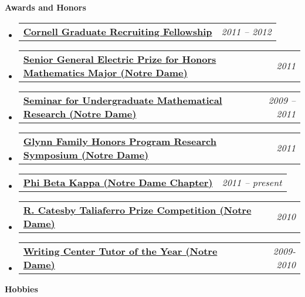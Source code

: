 \documentclass[letterpaper,11pt]{article}
\makeatletter
\newcommand{\resheading}[1]{{\large {\textbf{#1 \vphantom{p\^{E}}}}}}
\newenvironment{widetable}[1]
	       {\begin{tabular*}{#1}[t]{l@{\extracolsep{\fill}}r}}
	       {\end{tabular*}}
\newcommand{\resitemdate}[2]{
  \begin{widetable}{\textwidth - 28pt}
		\textbf{#1} & #2 \\
  \end{widetable}
  \vspace{-18pt}}
\makeatother
\begin{document}
\resheading{Awards and Honors}
\begin{itemize}
\item
  \resitemdate{\href{http://www.math.cornell.edu/Graduate/Funds/fellowships.html}{Cornell Graduate Recruiting Fellowship}}{\emph{2011 -- 2012}}
\item
  \resitemdate{\href{http://math.nd.edu/awards-and-recognition/undergraduate-awards/undergraduate-awards-2011/}{Senior General Electric Prize for Honors Mathematics Major (Notre Dame)}}{\emph{2011}} 
\item \resitemdate{\href{http://nd.edu/~sumr/}{Seminar for Undergraduate Mathematical Research (Notre Dame)}}{\emph{2009 -- 2011}}
\item \resitemdate{\href{http://glynnhonors.nd.edu/beyond/final-symposium/index.shtml}{Glynn Family Honors Program Research Symposium (Notre Dame)}}{\emph{2011}}

\item \resitemdate{\href{http://www.pbk.org/}{Phi Beta Kappa (Notre Dame Chapter)}}{\emph{2011 -- present}}

\item \resitemdate{\href{http://math.nd.edu/awards-and-recognition/undergraduate-awards/undergraduate-awards-2010/}{R. Catesby Taliaferro Prize Competition (Notre Dame)}}{\emph{2010}}


\item \resitemdate{\href{http://writingcenter.nd.edu/}{Writing Center Tutor of the Year (Notre Dame)}}{\emph{2009-2010}}

\end{itemize}

\resheading{Hobbies}
\end{document}
